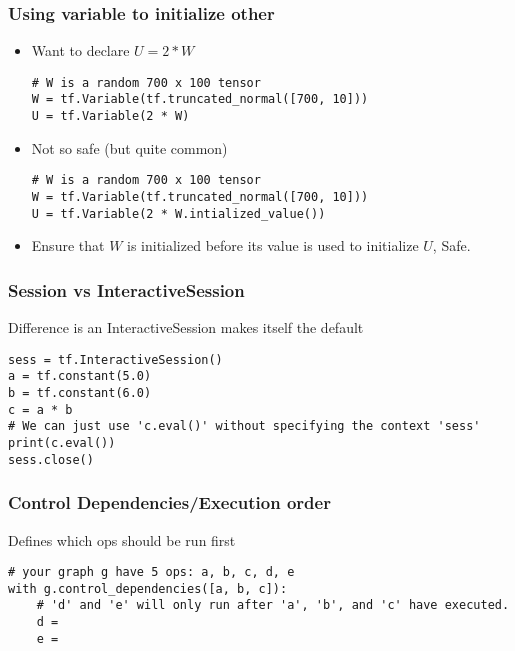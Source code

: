 \begin{frame}[fragile] \frametitle{Using variable to initialize other}
\begin{itemize}
\item Want to declare $U = 2 * W$

\begin{lstlisting}
# W is a random 700 x 100 tensor
W = tf.Variable(tf.truncated_normal([700, 10]))
U = tf.Variable(2 * W)
\end{lstlisting}
\item Not so safe (but quite common)
\begin{lstlisting}
# W is a random 700 x 100 tensor
W = tf.Variable(tf.truncated_normal([700, 10]))
U = tf.Variable(2 * W.intialized_value()) 
\end{lstlisting}
\item Ensure that $W$ is initialized before its value is used to initialize $U$, Safe.

\end{itemize}

\end{frame}


\begin{frame}[fragile] \frametitle{Session vs InteractiveSession}
Difference is an InteractiveSession makes itself the default

\begin{lstlisting}
sess = tf.InteractiveSession()
a = tf.constant(5.0)
b = tf.constant(6.0)
c = a * b
# We can just use 'c.eval()' without specifying the context 'sess'
print(c.eval())
sess.close()
\end{lstlisting}

\end{frame}

\begin{frame}[fragile] \frametitle{Control Dependencies/Execution order}
Defines which ops should be run first
\begin{lstlisting}
# your graph g have 5 ops: a, b, c, d, e
with g.control_dependencies([a, b, c]):
	# 'd' and 'e' will only run after 'a', 'b', and 'c' have executed.
	d = 
	e = 
\end{lstlisting}

\end{frame}

